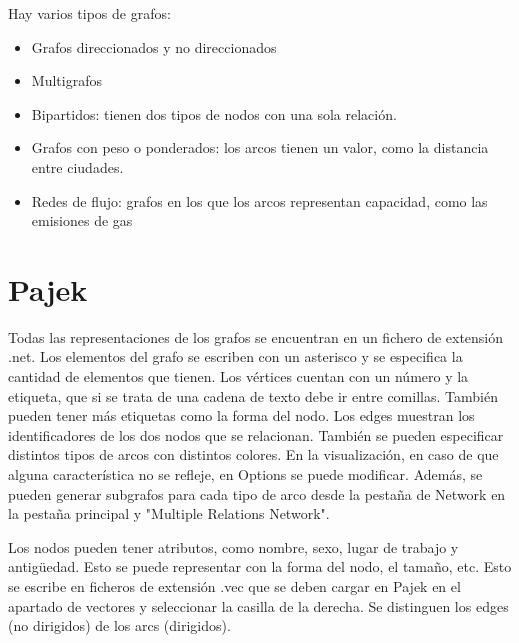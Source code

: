 \begin{itemize}
Hay varios tipos de grafos:
\begin{itemize}
\item Grafos direccionados y no direccionados
\item Multigrafos
\item Bipartidos: tienen dos tipos de nodos con una sola relación.
\item Grafos con peso o ponderados: los arcos tienen un valor, como la distancia entre ciudades.
\item Redes de flujo: grafos en los que los arcos representan capacidad, como las emisiones de gas
\end{itemize}
\end{itemize}

\section{Pajek} %
Todas las representaciones de los grafos se encuentran en un fichero de extensión .net. Los elementos del grafo se escriben con un asterisco y se especifica la cantidad de elementos que tienen. Los vértices cuentan con un número y la etiqueta, que si se trata de una cadena de texto debe ir entre comillas. También pueden tener más etiquetas como la forma del nodo. Los edges muestran los identificadores de los dos nodos que se relacionan. También se pueden especificar distintos tipos de arcos con distintos colores. En la visualización, en caso de que alguna característica no se refleje, en Options se puede modificar. Además, se pueden generar subgrafos para cada tipo de arco desde la pestaña de Network en la pestaña principal y "Multiple Relations Network". 

Los nodos pueden tener atributos, como nombre, sexo, lugar de trabajo y antigüedad. Esto se puede representar con la forma del nodo, el tamaño, etc. Esto se escribe en ficheros de extensión .vec que se deben cargar en Pajek en el apartado de vectores y seleccionar la casilla de la derecha. Se distinguen los edges (no dirigidos) de los arcs (dirigidos).  